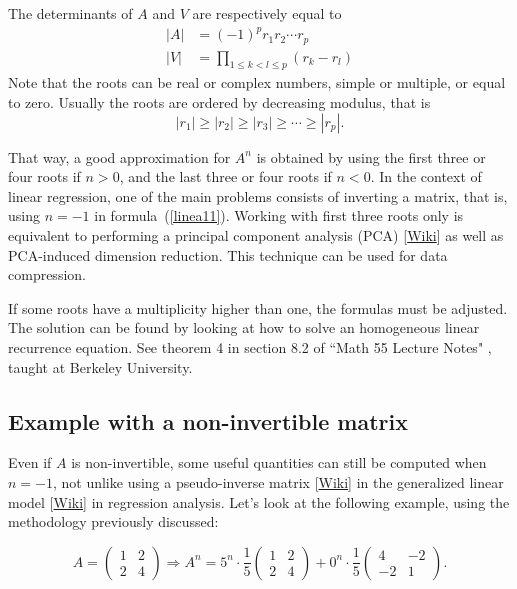 \documentclass[oneside,10pt]{book}
\begin{document}
The determinants of $A$ and $V$ are respectively equal to
$$
\begin{aligned}
      |A| & = (-1)^p r_1 r_2 \cdots r_p\\
     |V| & = \prod_{1\leq k < l\leq p} (r_k - r_l)
\end{aligned}
$$
Note that the roots can be real or complex numbers, simple or multiple, or equal to zero. Usually the roots are ordered by decreasing modulus, that is
$$
|r_1|\geq |r_2|\geq |r_3| \geq \cdots \geq |r_p|.
$$

\noindent That way, a good approximation for $A^n$ is obtained by using the first three or four roots if $n > 0$, and the last three or four roots if $n < 0$. In the context of linear regression, one of the main problems  consists of inverting a matrix, that is, using $n = -1$ in formula~(\ref{linea11}). Working with first three roots only  is equivalent to performing a
\textcolor{index}{principal component analysis} (PCA) [\href{https://en.wikipedia.org/wiki/Principal_component_analysis}{Wiki}] as well as PCA-induced dimension reduction.  This technique can be used for data compression.

If some roots have a multiplicity higher than one, the formulas must be adjusted. The solution can be found by looking at how to solve an homogeneous linear recurrence equation. See theorem 4 in section 8.2 of ``Math 55 Lecture Notes" \cite{arashfa}, taught at Berkeley University.

\subsection{Example with a non-invertible matrix}\label{slin1b}

Even if $A$ is non-invertible, some useful quantities can still be computed when $n = -1$, not unlike using a
\textcolor{index}{pseudo-inverse matrix} [\href{https://en.wikipedia.org/wiki/Moore\%E2\%80\%93Penrose_inverse}{Wiki}]
in the \textcolor{index}{generalized linear model} [\href{https://en.wikipedia.org/wiki/Generalized_linear_model}{Wiki}] in regression analysis. Let's look at the following example, using the methodology previously discussed:



\begin{equation*}
A=\left(
\begin{array}{cc}
      1 & 2\\
     2 & 4
\end{array}
\right) \Rightarrow A^n = 5^n \cdot \frac{1}{5}\left(
\begin{array}{cc}
 1 & 2 \\
 2 & 4
\end{array}
\right)
+ 0^n \cdot \frac{1}{5}
\left(
\begin{array}{rr}
 4 & -2 \\
 -2 &  1
\end{array}
\right).
\end{equation*}
\end{document}
